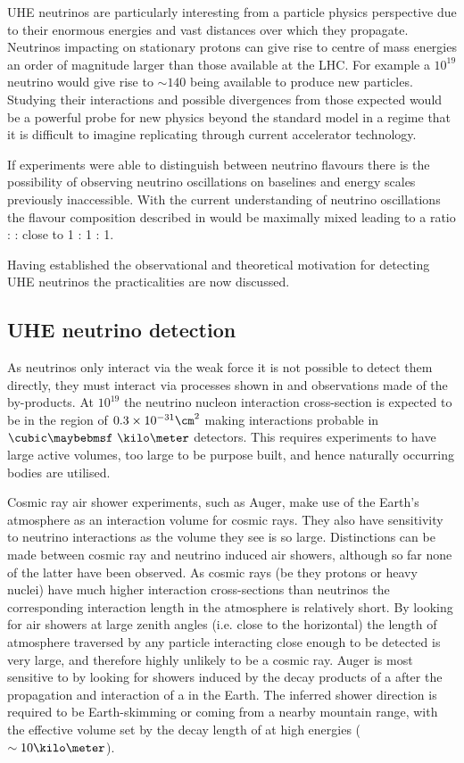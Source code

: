 UHE neutrinos are particularly interesting from a particle physics perspective due to their enormous energies and vast distances over which they propagate. Neutrinos impacting on stationary protons can give rise to centre of mass energies an order of magnitude larger than those available at the LHC. For example a $10^{19}$ \eV neutrino would give rise to $\sim 140$ \TeV being available to produce new particles. Studying their interactions and possible divergences from those expected would be a powerful probe for new physics beyond the standard model in a regime that it is difficult to imagine replicating through current accelerator technology.

If experiments were able to distinguish between neutrino flavours there is the possibility of observing neutrino oscillations on baselines and energy scales previously inaccessible. With the current understanding of neutrino oscillations the flavour composition described in  would be maximally mixed leading to a ratio \Pnue : \Pnum : \Pnut close to 1 : 1 : 1.

Having established the observational and theoretical motivation for detecting UHE neutrinos the practicalities are now discussed.

\subsection{UHE neutrino detection}
\label{sec:uhe-app:UHEN:detection}

As neutrinos only interact via the weak force it is not possible to detect them directly, they must interact via processes shown in  and observations made of the by-products. At $10^{19}$ \eV the neutrino nucleon interaction cross-section is expected to be in the region of $0.3 \times 10^{-31} \cm^{2}$  \cite{Gandhi199681} making interactions probable in $\cubic\km$ detectors. This requires experiments to have large active volumes, too large to be purpose built, and hence naturally occurring bodies are utilised.

Cosmic ray air shower experiments, such as Auger, make use of the Earth's atmosphere as an interaction volume for cosmic rays. They also have sensitivity to neutrino interactions as the volume they see is so large. Distinctions can be made between cosmic ray  and neutrino induced air showers, although so far none of the latter have been observed. As cosmic rays (be they protons or heavy nuclei) have much higher interaction cross-sections than neutrinos the corresponding interaction length in the atmosphere is relatively short. By looking for air showers at large zenith angles (i.e. close to the horizontal) the length of atmosphere traversed by any particle interacting close enough to be detected is very large, and therefore highly unlikely to be a cosmic ray. Auger is most sensitive to \Pnut by looking for showers induced by the decay products of a \Ptau after the propagation and interaction of a \Pnut in the Earth. The inferred shower direction is required to be Earth-skimming or coming from a nearby mountain range, with the effective volume set by the decay length of \Ptau at high energies ($\sim 10 \kilo\meter$).



